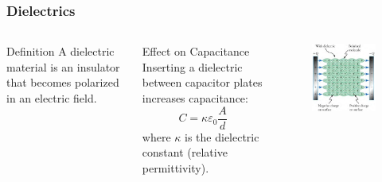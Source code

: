 \documentclass{beamer}
\begin{document}
\begin{frame}
    \frametitle{Dielectrics}
    \begin{columns}
        \begin{block}{Definition}
            A dielectric material is an insulator that becomes polarized in an electric field.
        \end{block}
        
        \begin{block}{Effect on Capacitance}
            Inserting a dielectric between capacitor plates increases capacitance:
            \begin{equation}
                C = \kappa \varepsilon_0 \frac{A}{d}
            \end{equation}
            where $\kappa$ is the dielectric constant (relative permittivity).
        \end{block}
        
        \begin{alertblock}{ }
           \begin{figure}
               \centering
               \includegraphics[width=1\linewidth]{dialecap.png}
           \end{figure}
        \end{alertblock}
    \end{columns}
\end{frame}
\end{document}
